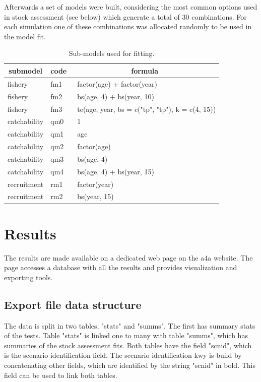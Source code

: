 \documentclass[a4paper]{article}\usepackage{graphicx, color}
\begin{document}
Afterwards a set of models were built, considering the most common options used in stock assessment (see below) which generate a total of 30 combinations. For each simulation one of these combinations was allocated randomly to be used in the model fit.




%
\begin{table}[H]
\caption{Sub-models used for fitting.\label{df0}} 
\begin{center}
\begin{tabular}{lll}
\hline
\multicolumn{1}{c}{submodel}&\multicolumn{1}{c}{code}&\multicolumn{1}{c}{formula}\tabularnewline
\hline
fishery&fm1&~factor(age) + factor(year)\tabularnewline
fishery&fm2&~bs(age, 4) + bs(year, 10)\tabularnewline
fishery&fm3&~te(age, year, bs = c("tp", "tp"), k = c(4, 15))\tabularnewline
catchability&qm0&~1\tabularnewline
catchability&qm1&~age\tabularnewline
catchability&qm2&~factor(age)\tabularnewline
catchability&qm3&~bs(age, 4)\tabularnewline
catchability&qm4&~bs(age, 4) + bs(year, 15)\tabularnewline
recruitment&rm1&~factor(year)\tabularnewline
recruitment&rm2&~bs(year, 15)\tabularnewline
\hline
\end{tabular}
\end{center}
\end{table}




\section{Results}

The results are made available on a dedicated web page on the a4a website. The page accesses a database with all the results and provides visualization and exporting tools.

\subsection{Export file data structure}

The data is split in two tables, "stats" and "summs". The first has summary stats of the tests. Table "stats" is linked one to many with table "summs", which has summaries of the stock assessment fits. Both tables have the field "scnid", which is the scenario identification field. The scenario identification kwy is build by concatenating other fields, which are identified by the string "scnid" in bold. This field can be used to link both tables. 
\end{document}
